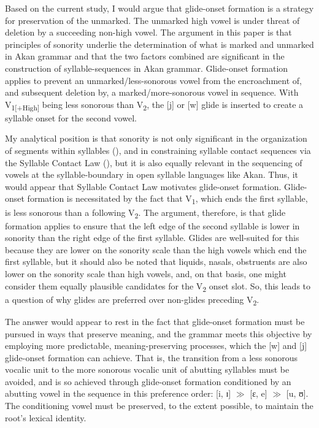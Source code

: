 \documentclass[output=paper,colorlinks,citecolor=brown]{langscibook}
\begin{document}
Based on the current study, I would argue that glide-onset formation is a strategy for preservation  of the unmarked. The unmarked high vowel is under threat of deletion by a succeeding non-high vowel. The argument in this paper is that principles of sonority underlie the determination of what is marked and unmarked in Akan grammar and that the two factors combined are significant in the construction of syllable-sequences in Akan grammar. Glide-onset formation applies to prevent an unmarked/less-sonorous vowel from the encroachment of, and subsequent deletion by, a marked/more-sonorous  vowel in sequence. With V\textsubscript{1[+High]} being less sonorous than V\textsubscript{2}, the [j] or [w] glide is inserted to create a syllable onset for the second vowel.\largerpage

My analytical position is that sonority is not only significant in the organization of segments within syllables (\citealt{Bybee1976, Clements1990, Jespersen1904, Selkirk1984, Steriade1982, Vennemann1972, Zec1988}), and in constraining syllable contact sequences via the Syllable Contact Law (\cite{MurrayVennemann1983}), but it is also equally relevant in the sequencing of vowels at the syllable-boundary in open syllable languages like Akan. Thus, it would appear that Syllable Contact Law motivates glide-onset formation. Glide-onset formation is necessitated by the fact that V\textsubscript{1}, which ends the first syllable, is less sonorous than a following V\textsubscript{2}. The argument, therefore, is that glide formation applies to ensure that the left edge of the second syllable is lower in sonority than the right edge of the first syllable. Glides are well-suited for this because they are lower on the sonority scale than the high vowels which end the first syllable, but it should also be noted that liquids, nasals, obstruents are also lower on the sonority scale than high vowels, and, on that basis, one might consider them equally plausible candidates for the V\textsubscript{2} onset slot. So, this leads to a question of why glides are preferred over non-glides preceding V\textsubscript{2}. 

The answer would appear to rest in the fact that glide-onset formation must be pursued in ways that  preserve meaning, and the grammar meets this objective by employing more predictable, meaning-preserving processes, which the [w] and [j] glide-onset formation can achieve. That is, the transition from a less sonorous vocalic unit to the more sonorous  vocalic unit of abutting syllables must be avoided, and is so achieved through glide-onset formation conditioned by an abutting vowel in the sequence in this preference order: [i, ɪ] $\gg$ [ɛ, e] $\gg$ [u, ʊ]. The conditioning vowel must be preserved, to the extent possible, to maintain the root's lexical identity.
\end{document}
